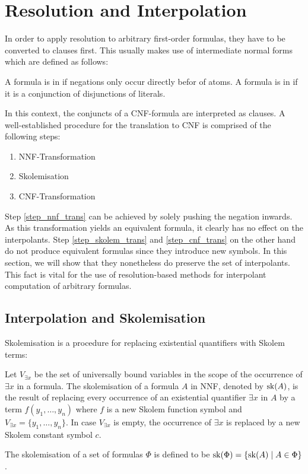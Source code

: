 \section{Resolution and Interpolation}


In order to apply resolution to arbitrary first-order formulas, they have to be converted to clauses first.
This usually makes use of intermediate normal forms which are defined as follows:

\begin{defi}
	A formula is in  if negations only occur directly befor of atoms.
	A formula is in  if it is a conjunction of disjunctions of literals.
\end{defi}

In this context, the conjuncts of a CNF-formula are interpreted as clauses.
A well-established procedure for the translation to CNF is comprised of the following steps:

\begin{enumerate}
		\item NNF-Transformation \label{step_nnf_trans}
		\item Skolemisation \label{step_skolem_trans}
		\item CNF-Transformation \label{step_cnf_trans}
\end{enumerate}

Step \ref{step_nnf_trans} can be achieved by solely pushing the negation inwards.
As this transformation yields an equivalent formula, it clearly has no effect on the interpolants.
Step \ref{step_skolem_trans} and \ref{step_cnf_trans} on the other hand do not produce equivalent formulas since they introduce new symbols.
In this section, we will show that they nonetheless do preserve the set of interpolants.
This fact is vital for the use of resolution-based methods for interpolant computation of arbitrary formulas.


\subsection{Interpolation and Skolemisation}

Skolemisation is a procedure for replacing existential quantifiers with Skolem terms:

\begin{defi}
	Let $V_{\exists x}$ be the set of universally bound variables in the scope of the occurrence of $\exists x$ in a formula.
	The skolemisation of a formula $A$ in NNF, denoted by $\mathrm{sk}(A)$, is the result of replacing every occurrence of an existential quantifier $\exists x$ in $A$ by a term $f(y_1, \ldots, y_n)$ where $f$ is a new Skolem function symbol and $V_{\exists x} = \{y_1, \ldots, y_n\}$.
	In case $V_{\exists x}$ is empty, the occurrence of $\exists x$ is replaced by a new Skolem constant symbol $c$.

	The skolemisation of a set of formulas $\Phi$ is defined to be $\mathrm{sk}(\Phi) = \{ \mathrm{sk}(A) \mid A \in \Phi \}$.
\end{defi}


